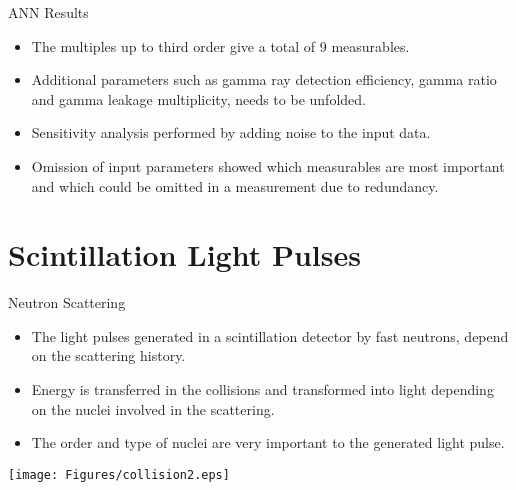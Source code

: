 \documentclass[clock,style=horatio,paper=screen,blackslide,trans=Wipe,mode=present]{powerdot}
\begin{document}
\begin{wideslide}{ANN Results}
\begin{itemize}
    \item The multiples up to third order give a total of 9
        measurables. \\[2mm]
    \item Additional parameters such as gamma ray detection
        efficiency, gamma ratio and gamma leakage
        multiplicity, needs to be unfolded.
\end{itemize}
{\vspace{5mm}\begin{itemize}
\item Sensitivity analysis performed by adding noise to the input
    data.
    \vspace{2mm}
\item Omission of input parameters showed which measurables are
    most important and which could be omitted in a measurement due to redundancy.
\end{itemize}}
\end{wideslide}



\section[slide=false]{Scintillation Light Pulses}


\begin{slide}{Neutron Scattering}
\begin{itemize}
    \item The light pulses generated in a scintillation
        detector by fast neutrons, depend on the scattering
        history. \\[2mm]
    \item Energy is transferred in the collisions and
        transformed into light depending on the nuclei
        involved in the scattering. \\[2mm]
    \item The order and type of nuclei are very important to
        the generated light pulse. \\[6mm]
\end{itemize}
\centering
\texttt{[image: Figures/collision2.eps]}
\end{slide}
\end{document}
